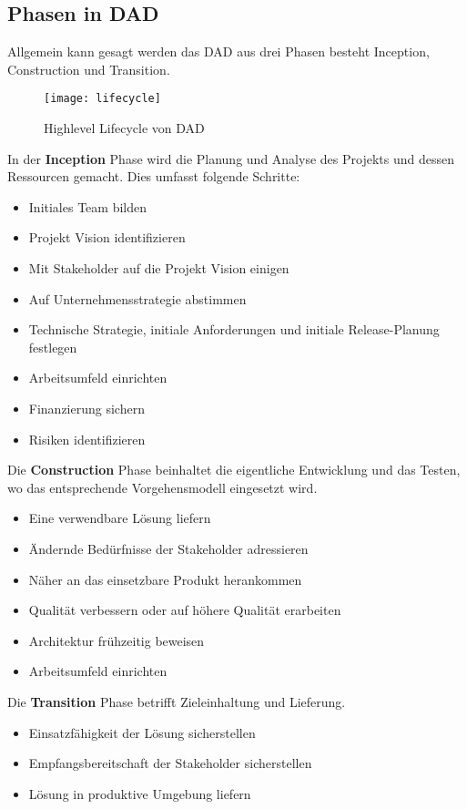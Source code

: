 \subsection{Phasen in DAD}
Allgemein kann gesagt werden das DAD aus drei Phasen besteht Inception, Construction und Transition.\smallskip
\begin{figure}[H]
	\centering
	\texttt{[image: lifecycle]}
	\caption{Highlevel Lifecycle von DAD}
	\label{fig:lifecycle}
\end{figure}\medskip
In der \textbf{Inception} Phase wird die Planung und Analyse des Projekts und dessen Ressourcen gemacht. Dies umfasst folgende Schritte:\smallskip
\begin{itemize}
	\item Initiales Team bilden
	\item Projekt Vision identifizieren
	\item Mit Stakeholder auf die Projekt Vision einigen
	\item Auf Unternehmensstrategie abstimmen
	\item Technische Strategie, initiale Anforderungen und initiale Release-Planung festlegen
	\item Arbeitsumfeld einrichten
	\item Finanzierung sichern
	\item Risiken identifizieren
\end{itemize}
\medskip
Die \textbf{Construction} Phase beinhaltet die eigentliche Entwicklung und das Testen, wo das entsprechende Vorgehensmodell eingesetzt wird.\smallskip
\begin{itemize}
	\item Eine verwendbare Lösung liefern
	\item Ändernde Bedürfnisse der Stakeholder adressieren 
	\item Näher an das einsetzbare Produkt herankommen
	\item Qualität verbessern oder auf höhere Qualität erarbeiten
	\item Architektur frühzeitig beweisen
	\item Arbeitsumfeld einrichten
\end{itemize}\medskip
Die \textbf{Transition} Phase betrifft Zieleinhaltung und Lieferung.
\begin{itemize}
	\item Einsatzfähigkeit der Lösung sicherstellen
	\item Empfangsbereitschaft der Stakeholder sicherstellen
	\item Lösung in produktive Umgebung liefern
\end{itemize}


